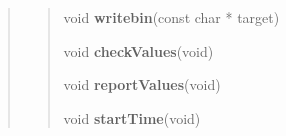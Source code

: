 \documentclass[letterpaper,10pt,english]{sphinxmanual}
\begin{document}
\begin{quote}
\begin{quote}
\begin{quote}






\end{quote}

\label{sphere_internals:project0classDEM_1a242634f10a9bc1f19e4eb46b7168f288}\label{sphere_internals:project0classDEM_1a242634f10a9bc1f19e4eb46b7168f288}
\begin{DUlineblock}{0em}
\item[] void \textbf{writebin}(const char * target)
\end{DUlineblock}

\begin{quote}






\end{quote}

\label{sphere_internals:project0classDEM_1a101aafa4f3197948fafbb1500e58f0f5}\label{sphere_internals:project0classDEM_1a101aafa4f3197948fafbb1500e58f0f5}
\begin{DUlineblock}{0em}
\item[] void \textbf{checkValues}(void)
\end{DUlineblock}

\begin{quote}






\end{quote}

\label{sphere_internals:project0classDEM_1ae2a1e6696686617f9cbe05b1a264212d}\label{sphere_internals:project0classDEM_1ae2a1e6696686617f9cbe05b1a264212d}
\begin{DUlineblock}{0em}
\item[] void \textbf{reportValues}(void)
\end{DUlineblock}

\begin{quote}






\end{quote}

\label{sphere_internals:project0classDEM_1a870787f68a947706aac1960e5cc1eda8}\label{sphere_internals:project0classDEM_1a870787f68a947706aac1960e5cc1eda8}
\begin{DUlineblock}{0em}
\item[] void \textbf{startTime}(void)
\end{DUlineblock}


\end{quote}
\end{quote}
\end{document}
